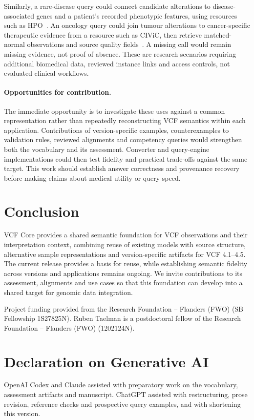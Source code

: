 \documentclass{ceurart}
\begin{document}
Similarly, a rare-disease query could connect candidate alterations to disease-associated genes and a patient's recorded phenotypic features, using resources such as HPO~\cite{hpo}.
An oncology query could join tumour alterations to cancer-specific therapeutic evidence from a resource such as CIViC, then retrieve matched-normal observations and source quality fields~\cite{griffith2017civic}.
A missing call would remain missing evidence, not proof of absence.
These are research scenarios requiring additional biomedical data, reviewed instance links and access controls, not evaluated clinical workflows.

\paragraph{Opportunities for contribution.}
The immediate opportunity is to investigate these uses against a common representation rather than repeatedly reconstructing VCF semantics within each application.
Contributions of version-specific examples, counterexamples to validation rules, reviewed alignments and competency queries would strengthen both the vocabulary and its assessment.
Converter and query-engine implementations could then test fidelity and practical trade-offs against the same target.
This work should establish answer correctness and provenance recovery before making claims about medical utility or query speed.

\section{Conclusion}

VCF Core provides a shared semantic foundation for VCF observations and their interpretation context, combining reuse of existing models with source structure, alternative sample representations and version-specific artifacts for VCF 4.1--4.5.
The current release provides a basis for reuse, while establishing semantic fidelity across versions and applications remains ongoing.
We invite contributions to its assessment, alignments and use cases so that this foundation can develop into a shared target for genomic data integration.

\begin{acknowledgments}
Project funding provided from the Research Foundation -- Flanders (FWO) (SB Fellowship 1S27825N).
Ruben Taelman is a postdoctoral fellow of the Research Foundation -- Flanders (FWO) (1202124N).
\end{acknowledgments}

\section*{Declaration on Generative AI}
OpenAI Codex and Claude assisted with preparatory work on the vocabulary, assessment artifacts and manuscript.
ChatGPT assisted with restructuring, prose revision, reference checks and prospective query examples, and with shortening this version.

\label{endofmain}
\clearpage
{
}
\end{document}
